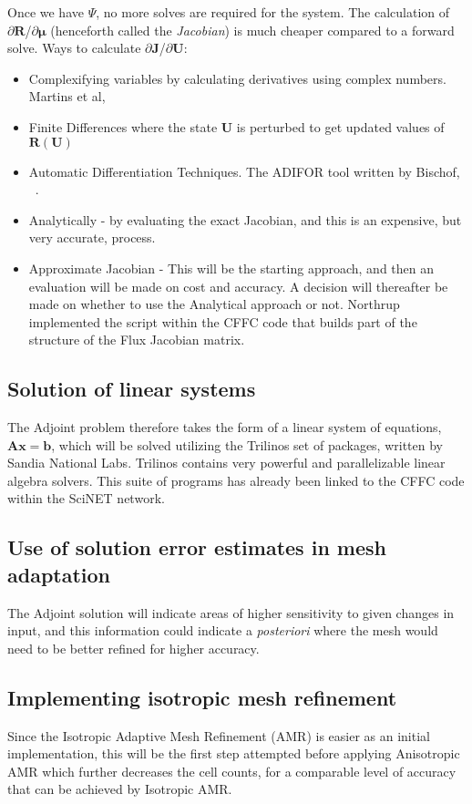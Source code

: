 Once we have $\Psi$, no more solves are required for the system. The calculation of ${\partial \mathbf{R}}$/$\partial{\mathbf{\mu}}$ (henceforth called the \textit{Jacobian}) is much cheaper compared to a forward solve. Ways to calculate ${\partial{\mathbf{J}}}$/${\partial{\mathbf{U}}}$:
\begin{itemize}
\item Complexifying variables by calculating derivatives using complex numbers. Martins et al, ~\cite{Martins:2003}
\item Finite Differences where the state $\mathbf{U}$ is perturbed to get updated values of $\mathbf{R}(\mathbf{U})$ 
\item Automatic Differentiation Techniques. The ADIFOR tool written by Bischof, ~\cite{Bischof94theadifor}.
\item Analytically - by evaluating the exact Jacobian, and this is an expensive, but very accurate, process.
\item Approximate Jacobian - This will be the starting approach, and then an evaluation will be made on cost and accuracy. A decision will thereafter be made on whether to use the Analytical approach or not. Northrup \cite{Northrup:2013} implemented the script within the CFFC code that builds part of the structure of the Flux Jacobian matrix.
\end{itemize}

\subsection{Solution of linear systems}
The Adjoint problem therefore takes the form of a linear system of equations, $\mathbf{Ax}=\mathbf{b}$, which will be solved utilizing the Trilinos set of packages, written by Sandia National Labs. Trilinos contains very powerful and parallelizable linear algebra solvers. This suite of programs has already been linked to the CFFC code within the SciNET network.

\subsection{Use of solution error estimates in mesh adaptation}
The Adjoint solution will indicate areas of higher sensitivity to given changes in input, and this information could indicate a \textit{posteriori} where the mesh would need to be better refined for higher accuracy.

\subsection{Implementing isotropic mesh refinement}
Since the Isotropic Adaptive Mesh Refinement (AMR) is easier as an initial implementation, this will be the first step attempted before applying Anisotropic AMR which further decreases the cell counts, for a comparable level of accuracy that can be achieved by Isotropic AMR.

